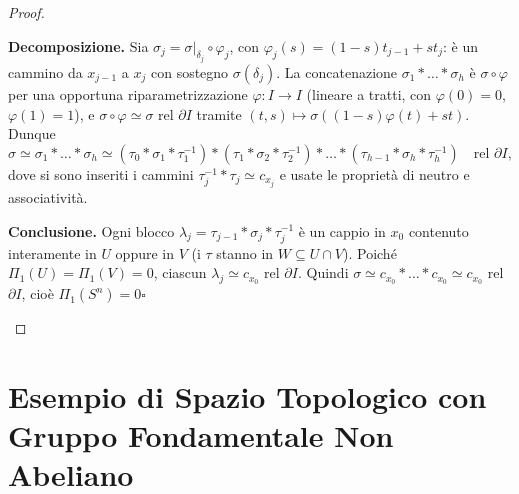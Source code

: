 \begin{proof}
\begin{itemize}
    \begin{center}
    \end{center}

    \textbf{Decomposizione.} Sia $\sigma_j = \sigma|_{\delta_j} \circ \varphi_j$, con $\varphi_j(s) = (1-s)t_{j-1} + s t_j$: \`e un cammino da $x_{j-1}$ a $x_j$ con sostegno $\sigma(\delta_j)$. La concatenazione $\sigma_1 * \dots * \sigma_h$ \`e $\sigma \circ \varphi$ per una opportuna riparametrizzazione $\varphi: I \to I$ (lineare a tratti, con $\varphi(0)=0$, $\varphi(1)=1$), e $\sigma \circ \varphi \simeq \sigma$ rel $\partial I$ tramite $(t,s) \mapsto \sigma((1-s)\varphi(t) + s t)$. Dunque
    \[
    \sigma \simeq \sigma_1 * \dots * \sigma_h \simeq (\tau_0 * \sigma_1 * \tau_1^{-1}) * (\tau_1 * \sigma_2 * \tau_2^{-1}) * \dots * (\tau_{h-1} * \sigma_h * \tau_h^{-1}) \quad \text{rel } \partial I ,
    \]
    dove si sono inseriti i cammini $\tau_j^{-1} * \tau_j \simeq c_{x_j}$ e usate le propriet\`a di neutro e associativit\`a.

    \textbf{Conclusione.} Ogni blocco $\lambda_j = \tau_{j-1} * \sigma_j * \tau_j^{-1}$ \`e un cappio in $x_0$ contenuto interamente in $U$ oppure in $V$ (i $\tau$ stanno in $W \subseteq U \cap V$). Poich\'e $\Pi_1(U) = \Pi_1(V) = 0$, ciascun $\lambda_j \simeq c_{x_0}$ rel $\partial I$. Quindi $\sigma \simeq c_{x_0} * \dots * c_{x_0} \simeq c_{x_0}$ rel $\partial I$, cio\`e $\Pi_1(S^n) = 0$\hfill$\square$
\end{itemize}
\end{proof}

\vspace{2em}

\section{Esempio di Spazio Topologico con Gruppo Fondamentale Non Abeliano}

